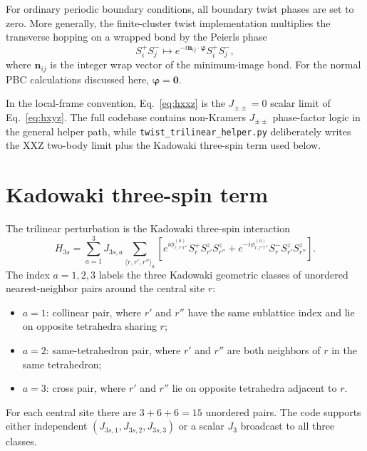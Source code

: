 \documentclass[11pt]{article}
\newcommand{\Jpmpm}{J_{\pm\pm}}
\begin{document}
For ordinary periodic boundary conditions, all boundary twist phases are set
to zero.  More generally, the finite-cluster twist implementation multiplies
the transverse hopping on a wrapped bond by the Peierls phase
\begin{equation}
  S^+_iS^-_j \mapsto
  e^{-i\bm n_{ij}\cdot\bm\varphi}S^+_iS^-_j,
\end{equation}
where $\bm n_{ij}$ is the integer wrap vector of the minimum-image bond.
For the normal PBC calculations discussed here, $\bm\varphi=\bm 0$.

In the local-frame convention, Eq.~\eqref{eq:hxxz} is the $\Jpmpm=0$ scalar
limit of Eq.~\eqref{eq:hxyz}.  The full codebase contains non-Kramers
$\Jpmpm$ phase-factor logic in the general helper path, while
\texttt{twist\_trilinear\_helper.py} deliberately writes the XXZ two-body
limit plus the Kadowaki three-spin term used below.

\section{Kadowaki three-spin term}

The trilinear perturbation is the Kadowaki three-spin interaction
\begin{equation}
  H_{3s}
  =
  \sum_{a=1}^{3} J_{3s,a}
  \sum_{\langle r,r',r''\rangle_a}
  \left[
    e^{i\phi^{(a)}_{r,r'r''}}
    S^+_{r}S^z_{r'}S^z_{r''}
    +
    e^{-i\phi^{(a)}_{r,r'r''}}
    S^-_{r}S^z_{r'}S^z_{r''}
  \right].
  \label{eq:h3s}
\end{equation}
The index $a=1,2,3$ labels the three Kadowaki geometric classes of unordered
nearest-neighbor pairs around the central site $r$:
\begin{itemize}
  \item $a=1$: collinear pair, where $r'$ and $r''$ have the same sublattice
        index and lie on opposite tetrahedra sharing $r$;
  \item $a=2$: same-tetrahedron pair, where $r'$ and $r''$ are both neighbors
        of $r$ in the same tetrahedron;
  \item $a=3$: cross pair, where $r'$ and $r''$ lie on opposite tetrahedra
        adjacent to $r$.
\end{itemize}
For each central site there are $3+6+6=15$ unordered pairs.  The code supports
either independent $(J_{3s,1},J_{3s,2},J_{3s,3})$ or a scalar $J_3$ broadcast
to all three classes.
\end{document}
